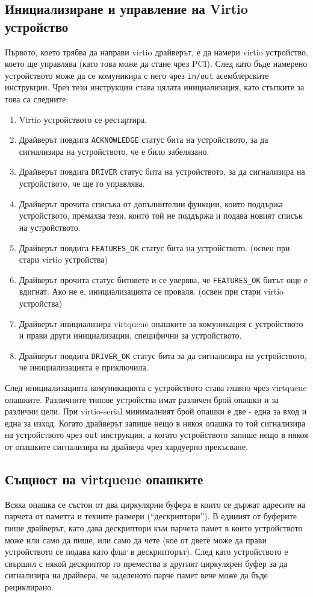   \subsection{Инициализиране и управление на Virtio устройство} \label{virtioinit}
  Първото, което трябва да направи virtio драйверът, е да намери virtio устройство, което ще управлява (като това може да стане чрез PCI). След като бъде намерено устройството може да се комуникира с него чрез {\tt in/out} асемблерските инструкции. Чрез тези инструкции става цялата инициализация, като стъпките за това са следните:
  \begin{enumerate}
    \item Virtio устройството се рестартира.
    \item Драйверът повдига {\tt ACKNOWLEDGE} статус бита на устройството, за да сигнализира на устройството, че е било забелязано.
    \item Драйверът повдига {\tt DRIVER} статус бита на устройството, за да сигнализира на устройството, че ще го управлява.
    \item Драйверът прочита списъка от допълнителни функции, които поддържа устройството, премахва тези, които той не поддържа и подава новият списък на устройството.
    \item Драйверът повдига {\tt FEATURES\_OK} статус бита на устройството. (освен при стари virtio устройства)
    \item Драйверът прочита статус битовете и се уверява, че {\tt FEATURES\_OK} битът още е вдигнат. Ако не е, инициализацията се проваля. (освен при стари virtio устройства)
    \item Драйверът инициализира virtqueue опашките за комуникация с устройството и прави други инициализации, специфични за устройството.
    \item Драйверът повдига {\tt DRIVER\_OK} статус бита за да сигнализира на устройството, че инициализацията е приключила.
  \end{enumerate}

  След инициализацията комуникацията с устройството става главно чрез virtqueue опашките. Различните типове устройства имат различен брой опашки и за различни цели. При virtio-serial минималният брой опашки е две - една за вход и една за изход. Когато драйверът запише нещо в някоя опашка то той сигнализира на устройството чрез {\tt out} инструкция, а когато устройството запише нещо в някоя от опашките сигнализира на драйвера чрез хардуерно прекъсване.

  \subsection{Същност на virtqueue опашките}
  Всяка опашка се състои от два циркулярни буфера в които се държат адресите на парчета от паметта и техните размери (``дескриптори''). В единият от буферите пише драйверът, като дава дескриптори към парчета памет в които устройството може или само да пише, или само да чете (кое от двете може да прави устройството се подава като флаг в дескрипторът). След като устройството е свършил с някой дескриптор го премества в другият циркулярен буфер за да сигнализира на драйвера, че заделеното парче памет вече може да бъде рециклирано.

